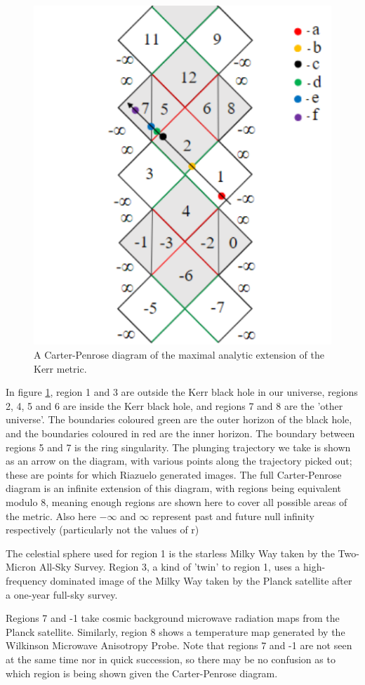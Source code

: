 \documentclass[oneside,openright,frontopenright, singlespacing]{dmathesis}
\begin{document}
\vspace{1em}
\begin{figure}[!ht]
	\centering
	\includegraphics[width=0.4\linewidth]{img/carter-penrose-kerr}
	\caption{A Carter-Penrose diagram of the maximal analytic extension of the Kerr metric.}
	\label{fig:Figure6.3}
\end{figure}

\vspace{1em}
	In figure \ref{fig:Figure6.3}, region 1 and 3 are outside the Kerr black hole in our universe, regions 2, 4, 5 and 6 are inside the Kerr black hole, and regions 7 and 8 are the 'other universe'. The boundaries coloured green are the outer horizon of the black hole, and the boundaries coloured in red are the inner horizon. The boundary between regions 5 and 7 is the ring singularity. The plunging trajectory we take is shown as an arrow on the diagram, with various points along the trajectory picked out; these are points for which Riazuelo generated images. The full Carter-Penrose diagram is an infinite extension of this diagram, with regions being equivalent modulo 8, meaning enough regions are shown here to cover all possible areas of the metric. Also here $-\infty$ and $\infty$ represent past and future null infinity respectively (particularly not the values of r)

\vspace{1em}
	The celestial sphere used for region 1 is the starless Milky Way taken by the Two-Micron All-Sky Survey\cite{skrutskie2006two}. Region 3, a kind of 'twin' to region 1, uses a high-frequency dominated image of the Milky Way taken by the Planck satellite after a one-year full-sky survey\cite{planck2011astronomy}.

\vspace{1em}
	Regions 7 and -1 take cosmic background microwave radiation maps from the Planck satellite\cite{adam2016planck}. Similarly, region 8 shows a temperature map generated by the Wilkinson Microwave Anisotropy Probe\cite{bennet2013wmap}. Note that regions 7 and -1 are not seen at the same time nor in quick succession, so there may be no confusion as to which region is being shown given the Carter-Penrose diagram.
\end{document}
